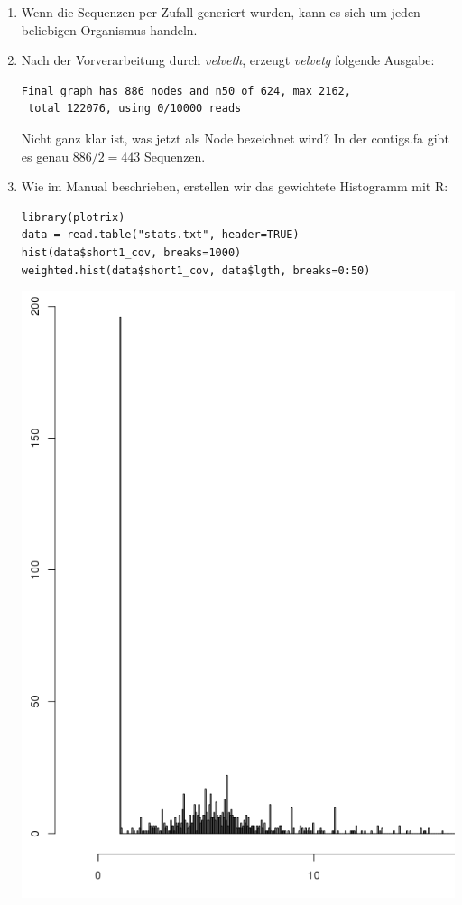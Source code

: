 \documentclass{homework}
\begin{document}
\begin{enumerate}
\begin{enumerate}
\item 
Wenn die Sequenzen per Zufall generiert wurden, kann es sich um jeden beliebigen Organismus handeln.
\item 
Nach der Vorverarbeitung durch \textit{velveth}, erzeugt \textit{velvetg} folgende Ausgabe:
\begin{verbatim}
Final graph has 886 nodes and n50 of 624, max 2162, 
 total 122076, using 0/10000 reads
\end{verbatim}
Nicht ganz klar ist, was jetzt als Node bezeichnet wird? In der contigs.fa gibt es genau $886 / 2 = 443$ Sequenzen.
\item 
Wie im Manual beschrieben, erstellen wir das gewichtete Histogramm mit R:
\begin{verbatim}
library(plotrix)
data = read.table("stats.txt", header=TRUE)
hist(data$short1_cov, breaks=1000)
weighted.hist(data$short1_cov, data$lgth, breaks=0:50)
\end{verbatim}
\includegraphics[scale=0.3]{data/aufg_36_3_a}

\end{enumerate}
\end{enumerate}
\end{document}
